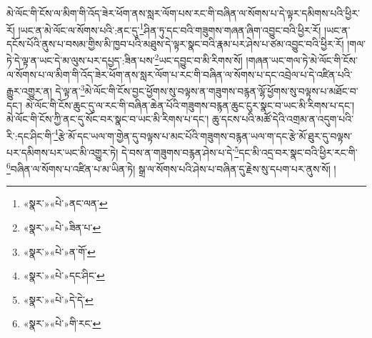 མེ་ལོང་གི་ངོས་ལ་མིག་གི་འོད་ཟེར་ཕོག་ནས་སླར་ལོག་པས་རང་གི་བཞིན་ལ་སོགས་པ་དེ་ལྟར་དམིགས་པའི་ཕྱིར་རོ། །ཡང་ན་མེ་ལོང་ལ་སོགས་པའི་:ནང་དུ་\footnote{«སྣར་»«པེ་»ནང་ལན་}ཤིན་ཏུ་དང་བའི་གཟུགས་གཞན་ཞིག་འབྱུང་བའི་ཕྱིར་རོ། །ཡང་ན་དངོས་པོའི་ནུས་པ་བསམ་གྱིས་མི་ཁྱབ་པའི་མཐུས་དེ་ལྟར་སྣང་བའི་རྣམ་པར་ཤེས་པ་ཙམ་འབྱུང་བའི་ཕྱིར་རོ། །གལ་ཏེ་དེ་ལྟ་ན་ཡང་དེ་མ་ལུས་པར་དཔྱད་:ཟིན་པས་\footnote{«སྣར་»«པེ་»ཟིན་པ་}ཡང་དབྱུང་བ་མི་རིགས་སོ། །གཞན་ཡང་གལ་ཏེ་མེ་ལོང་གི་ངོས་ལ་སོགས་པ་ལ་མིག་གི་འོད་ཟེར་ཕོག་ནས་སླར་ལོག་པ་རང་གི་བཞིན་ལ་སོགས་པ་དང་འབྲེལ་པ་དེ་འཛིན་པའི་རྒྱུར་འགྱུར་ན། དེ་ལྟ་ན་\footnote{«སྣར་»«པེ་»ན་གོ་}མེ་ལོང་གི་ངོས་བྱང་ཕྱོགས་སུ་བལྟས་ན་གཟུགས་བརྙན་ལྷོ་ཕྱོགས་སུ་བལྟས་པ་མཐོང་བ་དང་། མེ་ལོང་གི་ངོས་ཆུང་དུ་ལ་རང་གི་བཞིན་ཆེན་པོའི་གཟུགས་བརྙན་ཆུང་ངུར་སྣང་བ་ཡང་མི་རིགས་པ་དང་། མེ་ལོང་གི་ངོས་ཀྱི་ནང་དུ་སོང་བར་སྣང་བ་ཡང་མི་རིགས་པ་དང་། ཆུ་དངས་པའི་མཚོ་དེའི་འགྲམ་ན་འདུག་པའི་རི་:དང་ཤིང་གི་\footnote{«སྣར་»«པེ་»དང་ཤིང་}རྩེ་མོ་དང་ཡལ་ག་གྱེན་དུ་བལྟས་པ་མང་པོའི་གཟུགས་བརྙན་ཡལ་ག་དང་རྩེ་མོ་ཐུར་དུ་བལྟས་པར་དམིགས་པར་ཡང་མི་འགྱུར་ཏེ། དེ་བས་ན་གཟུགས་བརྙན་ཤེས་པ་དེ་\footnote{«སྣར་»«པེ་»དེ་དེ་}དང་མི་འདྲ་བར་སྣང་བའི་ཕྱིར་རང་གི་\footnote{«སྣར་»«པེ་»གི་རང་}བཞིན་ལ་སོགས་པ་འཛིན་པ་མ་ཡིན་ཏེ། སྒྲ་ལ་སོགས་པའི་ཤེས་པ་བཞིན་དུ་རྗེས་སུ་དཔག་པར་ནུས་སོ། །

